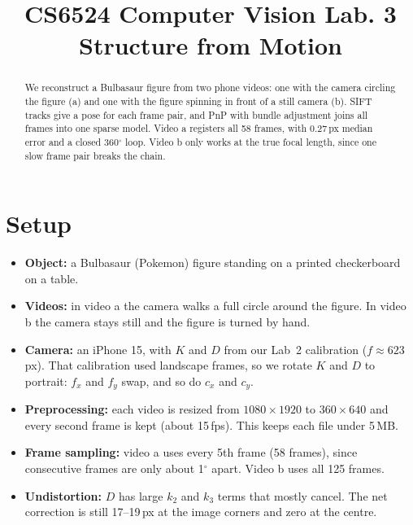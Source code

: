 \documentclass[conference]{assets/latex/IEEEtran}
\begin{document}
\title{CS6524 Computer Vision Lab. 3\\ Structure from Motion}

\author{
\and
{}
}

\maketitle

\begin{abstract}
We reconstruct a Bulbasaur figure from two phone videos: one with the camera
circling the figure (a) and one with the figure spinning in front of a still
camera (b). SIFT tracks give a pose for each frame pair, and PnP with bundle
adjustment joins all frames into one sparse model. Video a registers all 58
frames, with 0.27\,px median error and a closed 360$^\circ$ loop. Video b only
works at the true focal length, since one slow frame pair breaks the chain.
\end{abstract}

\section{Setup}
\begin{itemize}
\item \textbf{Object:} a Bulbasaur (Pokemon) figure standing on a printed
checkerboard on a table.
\item \textbf{Videos:} in video a the camera walks a full circle around the
figure. In video b the camera stays still and the figure is turned by hand.
\item \textbf{Camera:} an iPhone 15, with $K$ and $D$ from our Lab~2
calibration ($f \approx 623$\,px). That calibration used landscape frames, so we
rotate $K$ and $D$ to portrait: $f_x$ and $f_y$ swap, and so do $c_x$ and $c_y$.
\item \textbf{Preprocessing:} each video is resized from $1080\times1920$ to
$360\times640$ and every second frame is kept (about 15\,fps). This keeps each
file under 5\,MB.
\item \textbf{Frame sampling:} video a uses every 5th frame (58 frames), since
consecutive frames are only about 1$^\circ$ apart. Video b uses all 125 frames.
\item \textbf{Undistortion:} $D$ has large $k_2$ and $k_3$ terms that mostly
cancel. The net correction is still 17--19\,px at the image corners and zero at
the centre.
\end{itemize}
\end{document}

